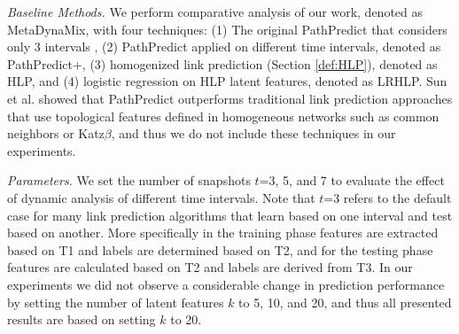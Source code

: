 





\textit{Baseline Methods.} We perform comparative analysis of our work, denoted as {MetaDynaMix}, with four techniques: (1) The original {PathPredict} that considers only 3 intervals \cite{sun2011ASONAM}, (2) PathPredict applied on different time intervals, denoted as {PathPredict+}, (3) homogenized link prediction (Section \ref{def:HLP}), denoted as {HLP}, and (4) logistic regression on HLP latent features, denoted as {LRHLP}. %
Sun et al. \cite{sun2011ASONAM} showed that {PathPredict} outperforms traditional link prediction approaches that use topological features defined in homogeneous networks such as common neighbors or Katz$\beta$, and thus we do not include these techniques in our experiments.




\textit{Parameters.} We set the number of snapshots $t$=3, 5, and 7 to evaluate the effect of dynamic analysis of different time intervals. Note that $t$=3 refers to the default case for many link prediction algorithms that learn based on one interval and test based on another. More specifically in the training phase features are extracted based on T1 and labels are determined based on T2, and for the testing phase features are calculated based on T2 and labels are derived from T3. In our experiments we did not observe a considerable change in prediction performance by setting the number of latent features $k$ to 5, 10, and 20, and thus all presented results are based on setting $k$ to 20. %

